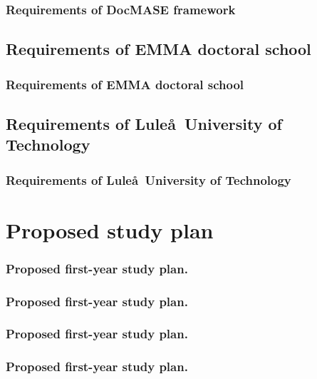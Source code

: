 \documentclass[first,firstsupp,lastsupp,handout,last,hyperref,table]{ETHclass}
\begin{document}
\begin{frame}
\frametitle{Requirements of DocMASE framework}
\vspace{-.5cm}
\centering

\end{frame}

\subsection{Requirements of EMMA doctoral school}

\begin{frame}
\frametitle{Requirements of EMMA doctoral school}
\vspace{-.5cm}
\centering

\end{frame}

\subsection{Requirements of Lule\aa\ University of Technology}

\begin{frame}
\frametitle{Requirements of Lule\aa\ University of Technology}
\vspace{-.5cm}
\centering

\end{frame}

\section{Proposed study plan}

\begin{frame}
\frametitle{Proposed first-year study plan.}
\vspace{-.6cm}
\centering

\end{frame}

\begin{frame}
\frametitle{Proposed first-year study plan.}
\vspace{-.5cm}
\centering

\end{frame}

\begin{frame}
\frametitle{Proposed first-year study plan.}
\vspace{-.5cm}
\centering

\end{frame}

\begin{frame}
\frametitle{Proposed first-year study plan.}
\vspace{-.5cm}
\centering

\end{frame}
\end{document}
